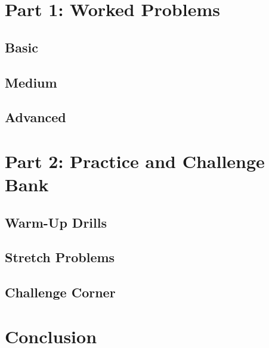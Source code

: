 \documentclass[12pt]{article}
\begin{document}
\section{Part 1: Worked Problems}

\subsection{Basic}


\subsection{Medium}


\subsection{Advanced}


\section{Part 2: Practice and Challenge Bank}

\subsection{Warm-Up Drills}


\subsection{Stretch Problems}


\subsection{Challenge Corner}


\section{Conclusion}
\end{document}
